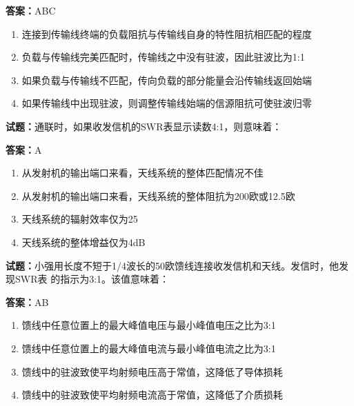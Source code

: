 \documentclass{ctexbook}
\begin{document}
\textbf{答案：}ABC 

\begin{enumerate}[leftmargin=3em]
  \item 连接到传输线终端的负载阻抗与传输线自身的特性阻抗相匹配的程度 

  \item 负载与传输线完美匹配时，传输线之中没有驻波，因此驻波比为1:1 

  \item 如果负载与传输线不匹配，传向负载的部分能量会沿传输线返回始端 

  \item 如果传输线中出现驻波，则调整传输线始端的信源阻抗可使驻波归零 

\end{enumerate}






\vspace{1em}

\textbf{试题：}通联时，如果收发信机的SWR表显示读数4:1，则意味着： 

\textbf{答案：}A 

\begin{enumerate}[leftmargin=3em]
  \item 从发射机的输出端口来看，天线系统的整体匹配情况不佳 

  \item 从发射机的输出端口来看，天线系统的整体阻抗为200欧或12.5欧 

  \item 天线系统的辐射效率仅为25%

  \item 天线系统的整体增益仅为4dB 

\end{enumerate}





\vspace{1em}

\textbf{试题：}小强用长度不短于1/4波长的50欧馈线连接收发信机和天线。发信时，他发现SWR表
的指示为3:1。该值意味着： 

\textbf{答案：}AB 

\begin{enumerate}[leftmargin=3em]
  \item 馈线中任意位置上的最大峰值电压与最小峰值电压之比为3:1 

  \item 馈线中任意位置上的最大峰值电流与最小峰值电流之比为3:1 

  \item 馈线中的驻波致使平均射频电压高于常值，这降低了导体损耗 

  \item 馈线中的驻波致使平均射频电流高于常值，这降低了介质损耗 

\end{enumerate}
\end{document}
